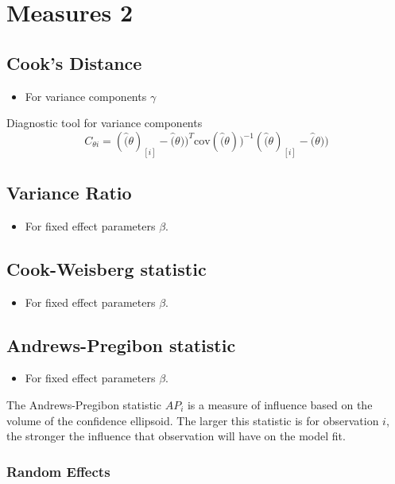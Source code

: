 \documentclass[12pt, a4paper]{report}
\begin{document}
\section{Measures 2} %
\subsection{Cook's Distance} %
\begin{itemize}
	\item For variance components $\gamma$
\end{itemize}

Diagnostic tool for variance components
\[ C_{\theta i} =(\hat(\theta)_{[i]} - \hat(\theta))^{T}\mbox{cov}( \hat(\theta))^{-1}(\hat(\theta)_{[i]} - \hat(\theta))\]


\subsection{Variance Ratio} %
\begin{itemize}
	\item For fixed effect parameters $\beta$.
\end{itemize}


\subsection{Cook-Weisberg statistic} %
\begin{itemize}
	\item For fixed effect parameters $\beta$.
\end{itemize}

\subsection{Andrews-Pregibon statistic} %
\begin{itemize}
	\item For fixed effect parameters $\beta$.
\end{itemize}
The Andrews-Pregibon statistic $AP_{i}$ is a measure of influence based on the volume of the confidence ellipsoid.
The larger this statistic is for observation $i$, the stronger the influence that observation will have on the model fit.





\subsubsection{Random Effects}
\end{document}
